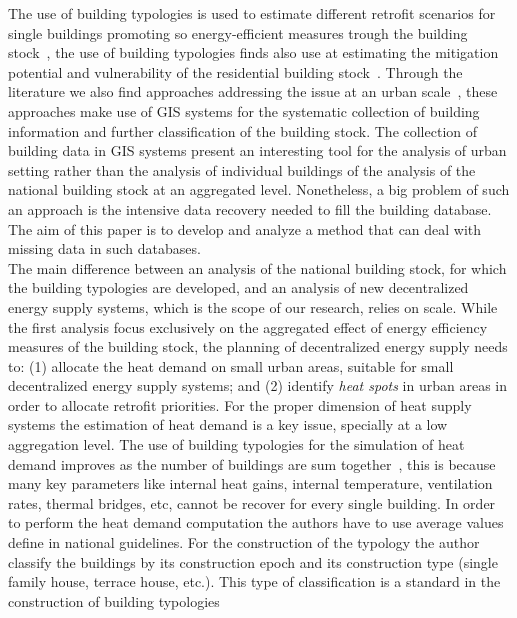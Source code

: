 \documentclass[authoryear,preprint,review,12pt]{elsarticle}
\begin{document}
\begin{linenumbers}
The use of building typologies is used to estimate different retrofit scenarios
for single buildings promoting so energy-efficient measures trough the building
stock~\cite{Kragh.2013, Singh.2013, Dascalaki.2011,
TABULAProjectTeam.2012}, the use of building typologies finds also use at
estimating the mitigation potential and vulnerability of the residential
building stock~\cite{Hrabovszky.2013}.  Through the literature we
also find approaches addressing the issue at an urban
scale~\cite{Caputo.2013}, these approaches make use of GIS systems for the
systematic collection of building information and further classification of the
building stock.  The collection of building data in GIS systems present an
interesting tool for the analysis of urban setting rather than the analysis of
individual buildings of the analysis of the national building stock at an
aggregated level. Nonetheless, a big problem of such an approach is the
intensive data recovery needed to fill the building database. The aim of this
paper is to develop and analyze a method that can deal with missing data in
such databases.\\

The main difference between an analysis of the national building stock, for
which the building typologies are developed, and an analysis of new decentralized
energy supply systems, which is the scope of our research, relies on scale.
While the first analysis focus exclusively on the aggregated effect of energy
efficiency measures of the building stock, the planning of decentralized energy
supply needs to:
(1) allocate the heat demand on small urban areas, suitable for small
decentralized energy supply systems; and
(2) identify \textit{heat spots} in urban areas in order to allocate retrofit
priorities.
For the proper dimension of heat supply systems the estimation of heat
demand is a key issue, specially at a low aggregation level.  The use of
building typologies for the simulation of heat demand improves as the number of
buildings are sum together~\cite{Blesl.2007}, this is because many key
parameters like internal heat gains, internal temperature, ventilation rates,
thermal bridges, etc, cannot be recover for every single building.  In order to
perform the heat demand computation the authors have to use average values
define in national guidelines.  For the construction of the typology the author
classify the buildings by its construction epoch and its construction type
(single family house, terrace house, etc.). This type of classification is a
standard in the construction of building typologies~\cite{Ebel.1990,
    ebokifeu.1996, ebokifeu.1998, ebok.2000, ebok.2005, Hildebrandt.2003,
    IWU.2003, Loga.2011, BSU.2011, Hermelink.2011, Kragh.2013,
    Singh.2013, Hrabovszky.2013, Caputo.2013}\\


\end{linenumbers}
\end{document}

